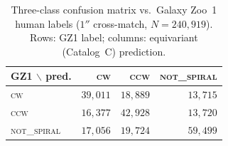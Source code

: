 \documentclass[aps,prd,twocolumn,superscriptaddress,preprintnumbers,nofootinbib,longbibliography,floatfix]{revtex4-2}
\newcommand{\CW}{\textsc{cw}}
\newcommand{\CCW}{\textsc{ccw}}
\newcommand{\NS}{\textsc{not\_spiral}}
\begin{document}
\begin{table}[t]
\caption{Three-class confusion matrix vs.\ Galaxy Zoo~1 human labels ($1''$ cross-match, $N\!=\!240{,}919$). Rows: GZ1 label; columns: equivariant (Catalog~C) prediction.\label{tab:gz1_confusion}}
\begin{ruledtabular}
\begin{tabular}{lrrr}
\textbf{GZ1 $\backslash$ pred.} & \textbf{\CW} & \textbf{\CCW} & \textbf{\NS} \\
\hline
\CW & $39{,}011$ & $18{,}889$ & $13{,}715$ \\
\CCW & $16{,}377$ & $42{,}928$ & $13{,}720$ \\
\NS & $17{,}056$ & $19{,}724$ & $59{,}499$ \\
\end{tabular}
\end{ruledtabular}
\end{table}
\end{document}
